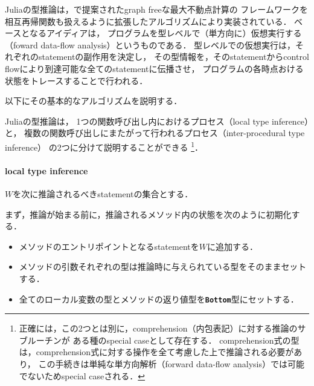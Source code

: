 Juliaの型推論は，\cite{graph-free-data-flow-analysis}で提案されたgraph freeな最大不動点計算の
フレームワークを相互再帰関数も扱えるように拡張したアルゴリズムにより実装されている．
ベースとなるアイディアは，
プログラムを型レベルで（単方向に）仮想実行する（foward data-flow analysis）というものである．
型レベルでの仮想実行は，それぞれのstatementの副作用を決定し，
その型情報を，そのstatementからcontrol flowにより到達可能な全てのstatementに伝播させ，
プログラムの各時点おける状態をトレースすることで行われる．

以下にその基本的なアルゴリズムを説明する\cite{jameson, julia-2012}．

Juliaの型推論は，
1つの関数呼び出し内におけるプロセス（local type inference）と，
複数の関数呼び出しにまたがって行われるプロセス（inter-procedural type inference）
の2つに分けて説明することができる
\footnote{
  正確には，この2つとは別に，comprehension（内包表記）に対する推論のサブルーチンが
  ある種のspecial caseとして存在する\cite{jameson}．
  comprehension式の型は，comprehension式に対する操作を全て考慮した上で推論される必要があり，
  この手続きは単純な単方向解析（forward data-flow analysis）では可能でないためspecial caseされる．
}．

\paragraph{local type inference}

\(W\)を次に推論されるべきstatementの集合とする． %

まず，推論が始まる前に，推論されるメソッド内の状態を次のように初期化する．

\begin{itemize}
  \item メソッドのエントリポイントとなるstatementを\(W\)に追加する．
  \item メソッドの引数それぞれの型は推論時に与えられている型をそのままセットする．
  \item 全てのローカル変数の型とメソッドの返り値型を\textbf{\texttt{Bottom}}型\footnotemark にセットする．
\end{itemize}


